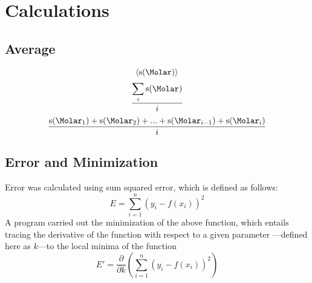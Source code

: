 \documentclass[a4paper]{article}
\def\mean#1{\left< #1 \right>}
\begin{document}
    \section{Calculations}
        \subsection{Average}
            \begin{equation}
                \mean{\si\s(\si\Molar)}
            \end{equation}
            \begin{equation}
                \frac{\displaystyle\sum_i{\si\s(\si\Molar)}}{i}
            \end{equation}
            \begin{equation}
                \frac{\si\s(\si\Molar_1)+\si\s(\si\Molar_2)+...+\si\s(\si\Molar_{i-1})+\si\s(\si\Molar_i)}{i}
            \end{equation}
        \subsection{Error and Minimization}
            \begin{center}
                Error was calculated using sum squared error, which is defined as follows:
                \begin{equation}
                    E=\displaystyle\sum_{i=1}^n{(y_i-f(x_i))^2}
                \end{equation}
                A program carried out the minimization of the above function, which entails
                tracing the derivative of the function with respect to a given parameter
                ---defined here as $k$---to the local minima of the function
                \begin{equation}
                    E'=\frac{\partial}{\partial k}(\displaystyle\sum_{i=1}^n{(y_i-f(x_i))^2})
                \end{equation}
            \end{center}
\end{document}
